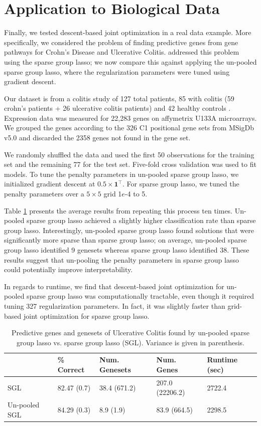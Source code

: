 \documentclass{statsoc}
\begin{document}
\section{Application to Biological Data}\label{realDataResults}
Finally, we tested descent-based joint optimization in a real data example. More specifically, we considered the problem of finding predictive genes from gene pathways for Crohn's Disease and Ulcerative Colitis. \citet{simon2013sparse} addressed this problem using the sparse group lasso; we now compare this against applying the un-pooled sparse group lasso, where the regularization parameters were tuned using gradient descent.

Our dataset is from a colitis study of 127 total patients, 85 with colitis (59 crohn's patients + 26 ulcerative colitis patients) and 42 healthy controls \citep{burczynski2006molecular}. Expression data was measured for 22,283 genes on affymetrix U133A microarrays. We grouped the genes according to the 326 C1 positional gene sets from MSigDb v5.0 \citep{subramanian2005gene} and discarded the 2358 genes not found in the gene set.

We randomly shuffled the data and used the first 50 observations for the training set and the remaining 77 for the test set. Five-fold cross validation was used to fit models. To tune the penalty parameters in un-pooled sparse group lasso, we initialized gradient descent at $0.5 \times \boldsymbol 1^\top$. For sparse group lasso, we tuned the penalty parameters over a $5 \times 5$ grid 1$e$-4 to 5.

Table \ref{colitis} presents the average results from repeating this process ten times. Un-pooled sparse group lasso achieved a slightly higher classification rate than sparse group lasso. Interestingly, un-pooled sparse group lasso found solutions that were significantly more sparse than sparse group lasso; on average, un-pooled sparse group lasso identified 9 genesets whereas sparse group lasso identified 38. These results suggest that un-pooling the penalty parameters in sparse group lasso could potentially improve interpretability.

In regards to runtime, we find that descent-based joint optimization for un-pooled sparse group lasso was computationally tractable, even though it required tuning 327 regularization parameters. In fact, it was slightly faster than grid-based joint optimization for sparse group lasso.

\begin{table}
\caption{\label{colitis} Predictive genes and genesets of Ulcerative Colitis found by un-pooled sparse group lasso vs. sparse group lasso (SGL). Variance is given in parenthesis.}
\centering
\begin{tabular}{| l | l | l | l | l | }
\hline
 & \% Correct  & Num. Genesets & Num. Genes & Runtime (sec) \\
\hline
SGL & 82.47 (0.7) & 38.4 (671.2) & 207.0 (22206.2) & 2722.4 \\
\hline
Un-pooled SGL & 84.29 (0.3) & 8.9 (1.9) & 83.9 (664.5) & 2298.5 \\
\hline
\end{tabular}
\end{table}
\end{document}
